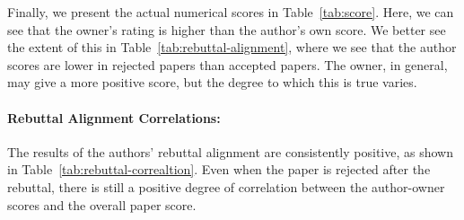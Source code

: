 \begin{minipage}[t]{\linewidth}
Finally, we present the actual numerical scores in Table~\ref{tab:score}. Here, we can see that the owner's rating is higher than the author's own score. We better see the extent of this in Table~\ref{tab:rebuttal-alignment}, where we see that the author scores are lower in rejected papers than accepted papers. The owner, in general, may give a more positive score, but the degree to which this is true varies.
\begin{table}[t]
\label{tab:rebuttal-alignment}
\end{table}
\begin{table}[t]
\label{tab:rebuttal-correaltion}
\end{table}
\paragraph{Rebuttal Alignment Correlations:}
The results of the authors' rebuttal alignment are consistently positive, as shown in Table~\ref{tab:rebuttal-correaltion}. Even when the paper is rejected after the rebuttal, there is still a positive degree of correlation between the author-owner scores and the overall paper score. 




\end{minipage}
